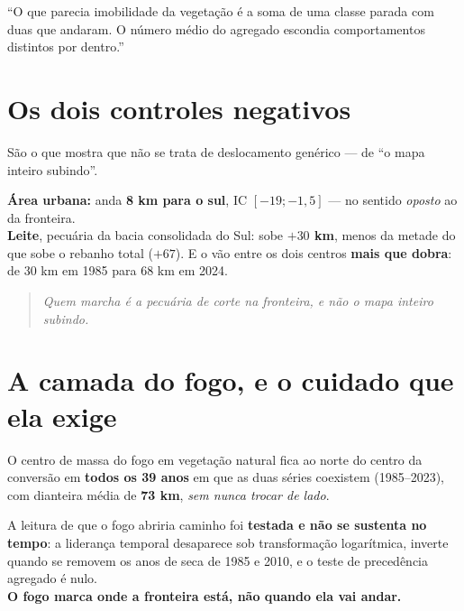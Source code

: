 \begin{nabanca}
``O que parecia imobilidade da vegetação é a soma de uma classe parada com duas
que andaram. O número médio do agregado escondia comportamentos distintos por
dentro.''
\end{nabanca}

\section{Os dois controles negativos}

São o que mostra que não se trata de deslocamento genérico --- de ``o mapa
inteiro subindo''.

\begin{ancora}[Os controles]
\textbf{Área urbana:} anda \textbf{8 km para o sul}, IC $[-19; -1{,}5]$ --- no
sentido \emph{oposto} ao da fronteira. \\
\textbf{Leite}, pecuária da bacia consolidada do Sul: sobe \textbf{$+30$ km},
menos da metade do que sobe o rebanho total ($+67$). E o vão entre os dois
centros \textbf{mais que dobra}: de 30 km em 1985 para 68 km em 2024.
\end{ancora}

\begin{quote}\itshape\color{cortinta}
Quem marcha é a pecuária de corte na fronteira, e não o mapa inteiro subindo.
\end{quote}

\section{A camada do fogo, e o cuidado que ela exige}

\begin{ancora}
O centro de massa do fogo em vegetação natural fica ao norte do centro da
conversão em \textbf{todos os 39 anos} em que as duas séries coexistem
(1985--2023), com dianteira média de \textbf{73 km}, \emph{sem nunca trocar de
lado}.
\end{ancora}

\begin{naodiz}
A leitura de que o fogo abriria caminho foi \textbf{testada e não se sustenta no
tempo}: a liderança temporal desaparece sob transformação logarítmica, inverte
quando se removem os anos de seca de 1985 e 2010, e o teste de precedência
agregado é nulo. \\[4pt]
\textbf{O fogo marca onde a fronteira está, não quando ela vai andar.}
\end{naodiz}

